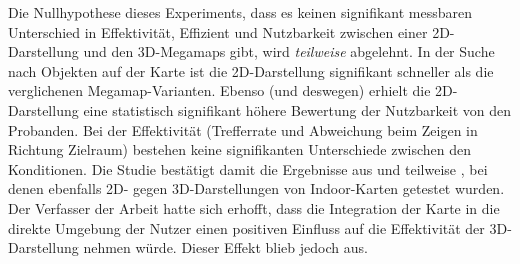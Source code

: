 Die Nullhypothese dieses Experiments, dass es keinen signifikant messbaren Unterschied in Effektivität, Effizient und Nutzbarkeit zwischen einer 2D-Darstellung und den 3D-Megamaps gibt, wird \emph{teilweise} abgelehnt.
In der Suche nach Objekten auf der Karte ist die 2D-Darstellung signifikant schneller als die verglichenen Megamap-Varianten.
Ebenso (und deswegen) erhielt die 2D-Darstellung eine statistisch signifikant höhere Bewertung der Nutzbarkeit von den Probanden.
Bei der Effektivität (Trefferrate und Abweichung beim Zeigen in Richtung Zielraum) bestehen keine signifikanten Unterschiede zwischen den Konditionen.
Die Studie bestätigt damit die Ergebnisse aus \autocite{Chittaro2006} und teilweise \autocite{Li2013}, bei denen ebenfalls 2D- gegen 3D-Darstellungen von Indoor-Karten getestet wurden.
Der Verfasser der Arbeit hatte sich erhofft, dass die Integration der Karte in die direkte Umgebung der Nutzer einen positiven Einfluss auf die Effektivität der 3D-Darstellung nehmen würde.
Dieser Effekt blieb jedoch aus.

%
\cleardoublepage
